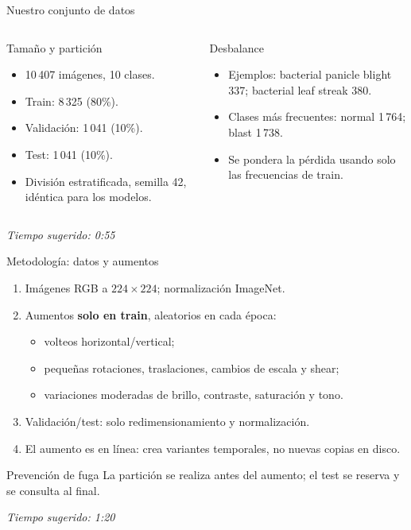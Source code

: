 \documentclass[aspectratio=169,11pt]{beamer}
\newcommand{\tiempo}[1]{\vfill\hfill\scriptsize\textit{Tiempo sugerido: #1}}
\begin{document}
\begin{frame}{Nuestro conjunto de datos}
    \begin{columns}[T]
        \begin{block}{Tamaño y partición}
            \begin{itemize}
                \item 10\,407 imágenes, 10 clases.
                \item Train: 8\,325 (80\%).
                \item Validación: 1\,041 (10\%).
                \item Test: 1\,041 (10\%).
                \item División estratificada, semilla 42, idéntica para los modelos.
            \end{itemize}
        \end{block}
        \begin{block}{Desbalance}
            \begin{itemize}
                \item Ejemplos: bacterial panicle blight 337; bacterial leaf streak 380.
                \item Clases más frecuentes: normal 1\,764; blast 1\,738.
                \item Se pondera la pérdida usando solo las frecuencias de train.
            \end{itemize}
        \end{block}
    \end{columns}
    \tiempo{0:55}
\end{frame}

\begin{frame}{Metodología: datos y aumentos}
    \begin{enumerate}
        \item Imágenes RGB a \(224\times224\); normalización ImageNet.
        \item Aumentos \textbf{solo en train}, aleatorios en cada época:
        \begin{itemize}
            \item volteos horizontal/vertical;
            \item pequeñas rotaciones, traslaciones, cambios de escala y shear;
            \item variaciones moderadas de brillo, contraste, saturación y tono.
        \end{itemize}
        \item Validación/test: solo redimensionamiento y normalización.
        \item El aumento es en línea: crea variantes temporales, no nuevas copias en disco.
    \end{enumerate}
    \begin{alertblock}{Prevención de fuga}
        La partición se realiza antes del aumento; el test se reserva y se consulta al final.
    \end{alertblock}
    \tiempo{1:20}
\end{frame}
\end{document}

